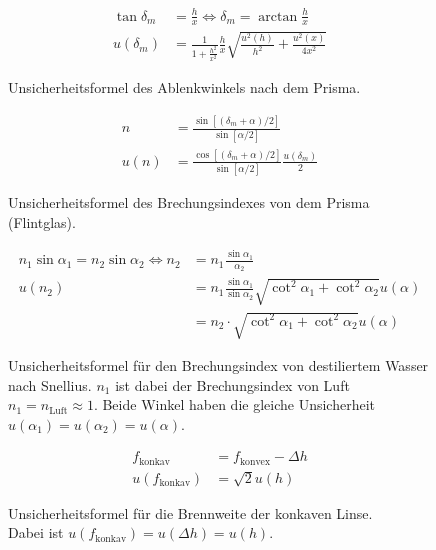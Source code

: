 \begin{figure}[ht]
	\begin{align*}
		\tan \delta_m &= \frac{h}{x} \Leftrightarrow \delta_m = \arctan \frac{h}{x}\\
		u(\delta_m) &= \frac{1}{1 + \frac{h^2}{x^2}} \frac{h}{x} 
		\sqrt{\frac{u^2(h)}{h^2} + \frac{u^2(x)}{4x^2}}
	\end{align*}
	\caption{Unsicherheitsformel des Ablenkwinkels nach dem Prisma.}
	\label{unc:winkel}
\end{figure}

\begin{figure}[ht]
	\begin{align*}
		n &= \frac{\sin[(\delta_m + \alpha) / 2]}{\sin [\alpha / 2]}\\
		u(n) &= \frac{\cos[(\delta_m + \alpha) / 2]}{\sin[\alpha / 2]} \frac{u(\delta_m)}{2}
	\end{align*}
	\caption{Unsicherheitsformel des Brechungsindexes von dem Prisma (Flintglas).}
	\label{unc:prisma}
\end{figure}

\begin{figure}[ht]
	\begin{align*}
		n_1 \sin \alpha_1 = n_2 \sin \alpha_2 \Leftrightarrow n_2 &= n_1 \frac{\sin \alpha_1}{\alpha_2}\\
		u(n_2) &= n_1 \frac{\sin \alpha_1}{\sin \alpha_2} \sqrt{\cot^2 \alpha_1 + \cot^2 \alpha_2} u(\alpha)\\
		&= n_2 \cdot \sqrt{\cot^2 \alpha_1 + \cot^2 \alpha_2} u(\alpha)
	\end{align*}
	\caption{Unsicherheitsformel für den Brechungsindex von destiliertem Wasser nach Snellius. $n_1$ ist dabei der Brechungsindex von Luft $n_1 = n_\text{Luft} \approx 1$. Beide Winkel haben die gleiche Unsicherheit $u(\alpha_1) = u(\alpha_2) = u(\alpha)$.}
	\label{unc:gitter}
\end{figure}

\begin{figure}[ht]
	\begin{align*}
		f_\text{konkav} &= f_\text{konvex} - \Delta h\\
		u(f_\text{konkav}) &= \sqrt{2} u(h)
	\end{align*}
	\caption{Unsicherheitsformel für die Brennweite der konkaven Linse.\\ Dabei ist $u(f_\text{konkav}) = u(\Delta h) = u(h)$.}
	\label{unc:differenz}
\end{figure}
